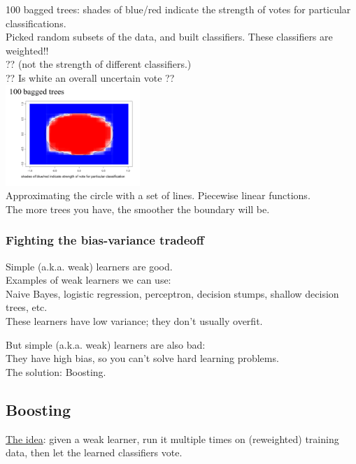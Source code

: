 100 bagged trees:  shades of blue/red indicate the strength of votes for particular classifications. \hfill \\
Picked random subsets of the data, and built classifiers.  These classifiers are weighted!! \hfill \\  %
?? (not the strength of different classifiers.)   \hfill \\ 
?? Is white an overall uncertain vote ??   \hfill \\ 
\includegraphics[width=2in]{figures/100_bagged_trees.pdf} \hfill \\
Approximating the circle with a set of lines.  Piecewise linear functions. \hfill \\ %
The more trees you have, the smoother the boundary will be. 

\subsubsection{Fighting the bias-variance tradeoff}
Simple (a.k.a. weak) learners are good. \hfill \\ 
Examples of weak learners we can use: \hfill \\ 
Naive Bayes, logistic regression, perceptron, decision stumps, shallow decision trees, etc. \hfill \\ 
These learners have low variance; they don't usually overfit. 

But simple (a.k.a. weak) learners are also bad: \hfill \\ 
They have high bias, so you can't solve hard learning problems. \hfill \\ 

The solution: Boosting. 

\subsection{Boosting}
\underline{The idea}: given a weak learner, run it multiple times on (reweighted) training data, 
	then let the learned classifiers vote.  \hfill \\
	
